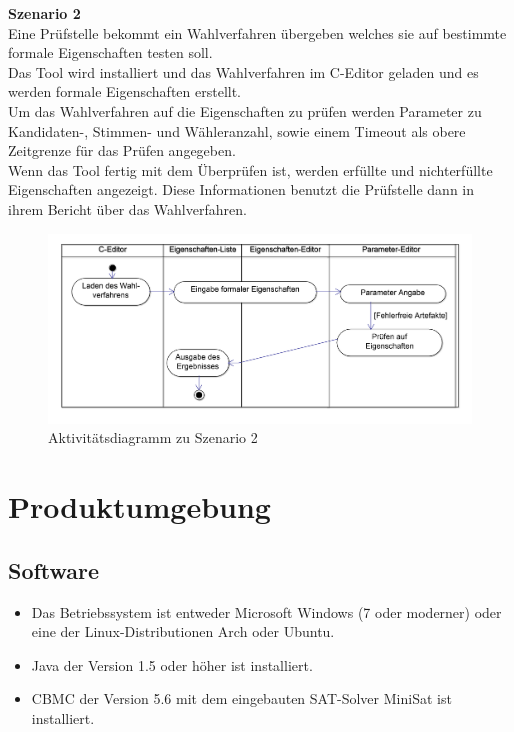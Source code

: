 \documentclass[a4paper]{scrreprt}
\begin{document}
\textbf{Szenario 2}\\
Eine Prüfstelle bekommt ein Wahlverfahren übergeben welches sie auf bestimmte formale Eigenschaften testen soll.\\
Das Tool wird installiert und das Wahlverfahren im C-Editor geladen und es werden formale Eigenschaften erstellt.\\
Um das Wahlverfahren auf die Eigenschaften zu prüfen werden Parameter zu \\Kandidaten-, Stimmen- und Wähleranzahl, sowie einem Timeout als obere Zeitgrenze für das Prüfen angegeben.\\
Wenn das Tool fertig mit dem Überprüfen ist, werden erfüllte und nichterfüllte Eigenschaften angezeigt. Diese Informationen benutzt die Prüfstelle dann in ihrem Bericht über das Wahlverfahren.\\

\begin{figure}[H]
\hspace{-1cm}
\includegraphics[scale=0.12]{ActivityDiagramScenario2.png}
\caption{Aktivitätsdiagramm zu Szenario 2}
\label{Packet-scetch}
\end{figure}

\chapter{Produktumgebung}

\section{Software}
\begin{itemize}
\item Das Betriebssystem ist entweder Microsoft Windows (7 oder moderner) oder eine der Linux-Distributionen Arch oder Ubuntu.
\item Java der Version 1.5 oder höher ist installiert.
\item CBMC der Version 5.6 mit dem eingebauten SAT-Solver MiniSat ist installiert.
\end{itemize}
\end{document}
